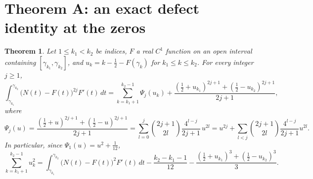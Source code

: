 \documentclass[preprint,12pt]{elsarticle}
\numberwithin{equation}{section}
\theoremstyle{plain}
\newtheorem{theorem}{Theorem}[section]
\theoremstyle{definition}
\theoremstyle{remark}
\begin{document}
\section{Theorem A: an exact defect identity at the zeros}
\label{sec:identities}

\begin{theorem}\label{thm:identity_general}
Let $1\le k_1<k_2$ be indices, $F$ a real $C^1$ function on an open interval containing $[\gamma_{k_1},\gamma_{k_2}]$, and $u_k=k-\frac12-F(\gamma_k)$ for $k_1\le k\le k_2$. For every integer $j\ge1$,
\begin{equation}
\int_{\gamma_{k_1}}^{\gamma_{k_2}}\bigl(N(t)-F(t)\bigr)^{2j}F'(t)\,dt=\sum_{k=k_1+1}^{k_2-1}\Psi_j(u_k)+\frac{(\frac12+u_{k_1})^{2j+1}+(\frac12-u_{k_2})^{2j+1}}{2j+1},
\label{eq:identity_general}
\end{equation}
where
\begin{equation}
\Psi_j(u)=\frac{(\frac12+u)^{2j+1}+(\frac12-u)^{2j+1}}{2j+1}=\sum_{l=0}^{j}\binom{2j+1}{2l}\frac{4^{l-j}}{2j+1}\,u^{2l}=u^{2j}+\sum_{l<j}\binom{2j+1}{2l}\frac{4^{l-j}}{2j+1}u^{2l}.
\label{eq:Psi_def}
\end{equation}
In particular, since $\Psi_1(u)=u^2+\frac1{12}$,
\begin{equation}
\sum_{k=k_1+1}^{k_2-1}u_k^2=\int_{\gamma_{k_1}}^{\gamma_{k_2}}\bigl(N(t)-F(t)\bigr)^2F'(t)\,dt-\frac{k_2-k_1-1}{12}-\frac{(\frac12+u_{k_1})^3+(\frac12-u_{k_2})^3}3 .
\label{eq:identity_quadratic}
\end{equation}
\end{theorem}
\end{document}
